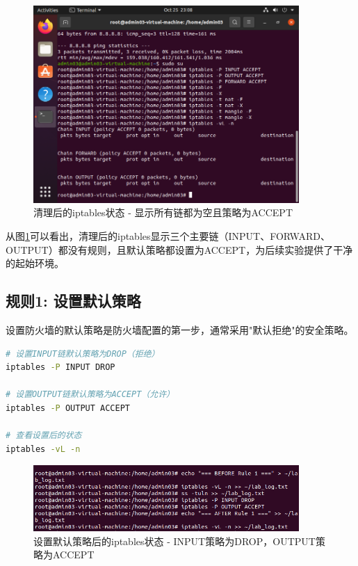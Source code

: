 \documentclass[12pt,a4paper]{article}
\begin{document}
\begin{figure}[H]
    \centering
    \includegraphics[width=0.9\textwidth]{02_clean_iptable.png}
    \caption{清理后的iptables状态 - 显示所有链都为空且策略为ACCEPT}
    \label{fig:clean_iptables}
\end{figure}

从图\ref{fig:clean_iptables}可以看出，清理后的iptables显示三个主要链（INPUT、FORWARD、OUTPUT）都没有规则，且默认策略都设置为ACCEPT，为后续实验提供了干净的起始环境。

\subsection{规则1: 设置默认策略}

设置防火墙的默认策略是防火墙配置的第一步，通常采用"默认拒绝"的安全策略。

\begin{lstlisting}[language=bash, caption=设置默认策略]
# 设置INPUT链默认策略为DROP（拒绝）
iptables -P INPUT DROP

# 设置OUTPUT链默认策略为ACCEPT（允许）
iptables -P OUTPUT ACCEPT

# 查看设置后的状态
iptables -vL -n
\end{lstlisting}

\begin{figure}[H]
    \centering
    \includegraphics[width=0.9\textwidth]{03_default_policy.png}
    \caption{设置默认策略后的iptables状态 - INPUT策略为DROP，OUTPUT策略为ACCEPT}
    \label{fig:default_policy}
\end{figure}
\end{document}
